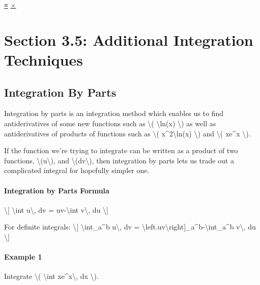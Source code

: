 \protect\hyperlink{main-nav}{≡} \protect\hyperlink{close-nav}{×}

\hypertarget{section-3.5-additional-integration-techniques}{%
\section{Section 3.5: Additional Integration
Techniques}\label{section-3.5-additional-integration-techniques}}

\hypertarget{integration-by-parts}{%
\subsection{Integration By Parts}\label{integration-by-parts}}

Integration by parts is an integration method which enables us to find
antiderivatives of some new functions such as \textbackslash{}(
\textbackslash{}ln(x) \textbackslash{}) as well as antiderivatives of
products of functions such as \textbackslash{}(
x\^{}2\textbackslash{}ln(x) \textbackslash{}) and \textbackslash{}(
xe\^{}x \textbackslash{}).

If the function we're trying to integrate can be written as a product of
two functions, \textbackslash{}(u\textbackslash{}), and
\textbackslash{}(dv\textbackslash{}), then integration by parts lets us
trade out a complicated integral for hopefully simpler one.

\hypertarget{integration-by-parts-formula}{%
\paragraph{Integration by Parts
Formula}\label{integration-by-parts-formula}}

\textbackslash{}{[} \textbackslash{}int u\textbackslash{}, dv =
uv-\textbackslash{}int v\textbackslash{}, du \textbackslash{}{]}

For definite integrals: \textbackslash{}{[} \textbackslash{}int\_a\^{}b
u\textbackslash{}, dv =
\textbackslash{}left.uv\textbackslash{}right{]}\_a\^{}b-\textbackslash{}int\_a\^{}b
v\textbackslash{}, du \textbackslash{}{]}

\hypertarget{example-1}{%
\paragraph{Example 1}\label{example-1}}

Integrate \textbackslash{}( \textbackslash{}int xe\^{}x\textbackslash{},
dx \textbackslash{}).

